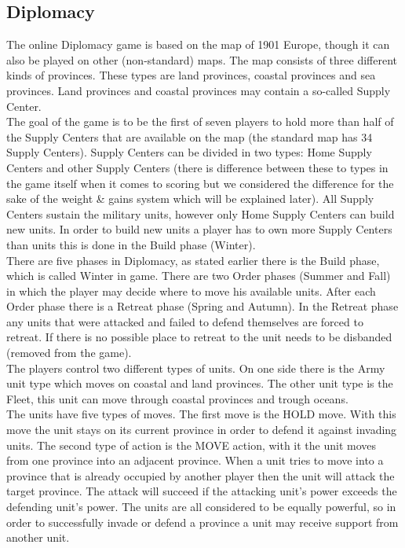 \documentclass[a4paper]{article} %
\begin{document}
\subsection{Diplomacy}
The online Diplomacy game is based on the map of 1901 Europe, though it can also be played on other (non-standard) maps. The map consists of three different kinds of provinces. These types are land provinces, coastal provinces and sea provinces. Land provinces and coastal provinces may contain a so-called Supply Center.
\\The goal of the game is to be the first of seven players to hold more than half of the Supply Centers that are available on the map (the standard map has 34 Supply Centers). Supply Centers can be divided in two types: Home Supply Centers and other Supply Centers (there is difference between these to types in the game itself when it comes to scoring but we considered the difference for the sake of the weight \& gains system which will be explained later). All Supply Centers sustain the military units, however only Home Supply Centers can build new units. In order to build new units a player has to own more Supply Centers than units this is done in the Build phase (Winter).
\\There are five phases in Diplomacy, as stated earlier there is the Build phase, which is called Winter in game. There are two Order phases (Summer and Fall) in which the player may decide where to move his available units. After each Order phase there is a Retreat phase (Spring and Autumn). In the Retreat phase any units that were attacked and failed to defend themselves are forced to retreat. If there is no possible place to retreat to the unit needs to be disbanded (removed from the game).
\\The players control two different types of units. On one side there is the Army unit type which moves on coastal and land provinces. The other unit type is the Fleet, this unit can move through coastal provinces and trough oceans.
\\The units have five types of moves. The first move is the HOLD move. With this move the unit stays on its current province in order to defend it against invading units.
The second type of action is the MOVE action, with it the unit moves from one province into an adjacent province. When a unit tries to move into a province that is already occupied by another player then the unit will attack the target province. The attack will succeed if the attacking unit's power exceeds the defending unit's power. The units are all considered to be equally powerful, so in order to successfully invade or defend a province a unit may receive support from another unit.
\end{document}
